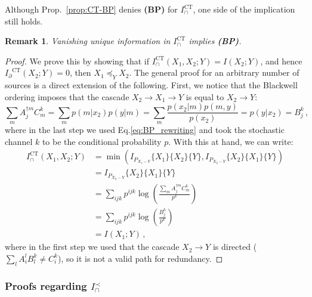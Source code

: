 \documentclass{article}
\newcommand{\Ip}{\ensuremath{I_\partial}\xspace}
\newcommand{\argct}[3]{\{#1\}\{#2\}\{#3\}}
\newcommand{\BP}{\textbf{(BP)}\xspace} %
\newcommand{\ICT}{\ensuremath{I_\cap^{\text{CT}}}\xspace}
\newcommand{\Iprec}{\ensuremath{I_\cap^{\prec}}\xspace}
\newcommand{\ICTs}{\ensuremath{I_\cap^{\text{CT}}(X_1,X_2;Y)}\xspace}
\newtheorem{remark}{Remark}
\begin{document}
Although Prop.~\ref{prop:CT-BP} denies \BP for $\ICT$, one side of the implication still holds. 
\begin{remark} \label{rem:CT-BP-undirected}
    Vanishing unique information in $\ICT$ implies \BP.
\end{remark}
\begin{proof}
    We prove this by showing that if $\ICTs=I(X_2;Y)$, and hence $\Ip^\text{CT}(X_2;Y)=0$, then $X_1\preceq_Y X_2$. The general proof for an arbitrary number of sources is a direct extension of the following.
    First, we notice that the Blackwell ordering imposes that the cascade $X_2\rightarrow X_1\rightarrow Y$ is equal to $X_2\rightarrow Y$:
    \begin{equation} \label{eq:CT_BP_casc}
        \sum_m A_j^{\dagger m} C^k_m = \sum_m p(m|x_2)p(y|m) = \sum_m \frac{p(x_2|m)p(m,y)}{p(x_2)} = p(y|x_2) = B^k_j \,,
    \end{equation}
    where in the last step we used Eq.\eqref{eq:BP_rewriting} and took the stochastic channel $k$ to be the conditional probability $p$.
    With this at hand, we can write:
    \begin{equation} \label{eq:CT_BP_red}
    \begin{aligned}
        \ICTs & = \min\left(I_{P_{X_1-Y}}\argct{X_1}{X_2}{Y}, I_{P_{X_2-Y}}\argct{X_2}{X_1}{Y}\right) \\
        & = I_{P_{X_2-Y}}\argct{X_2}{X_1}{Y} \\
        & = \sum_{ijk} p^{ijk} \log \left(\frac{\sum_m A_j^{\dagger m} C^k_m}{p^k} \right) \\
        & = \sum_{ijk} p^{ijk} \log \left(\frac{B_j^k}{p^k} \right) \\
        & = I(X_1;Y) \,,
    \end{aligned}
    \end{equation}
    where in the first step we used that the cascade $X_2\rightarrow Y$ is directed ($\sum_lA_i^lB_l^k\ne C^k_i$), so it is not a valid path for redundancy.  
\end{proof}


\subsubsection{Proofs regarding \Iprec}
\end{document}
